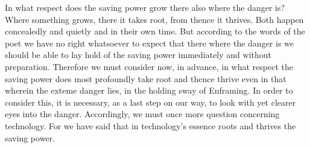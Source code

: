 In what respect does the saving power grow there also where the danger is? Where something grows, there it takes root, from thence it thrives. Both happen concealedly and quietly and in their own time. But according to the words of the poet we have no right whatsoever to expect that there where the danger is we should be able to lay hold of the saving power immediately and without preparation. Therefore we must consider now, in advance, in what respect the saving power does most profoundly take root and thence thrive even in that wherein the exteme danger lies, in the holding sway of Enframing. In order to consider this, it is necessary, as a last step on our way, to look with yet clearer eyes into the danger. Accordingly, we must once more question concerning technology. For we have said that in technology's essence roots and thrives the saving power.
